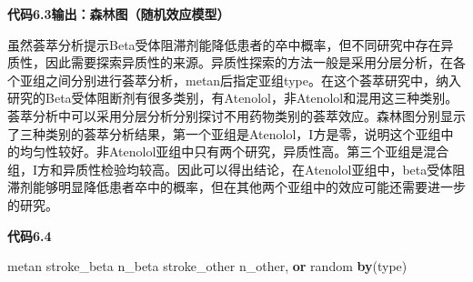 \documentclass[
  chinese-hans,
  letterpaper,
  DIV=11,
  numbers=noendperiod]{scrreprt}
\newenvironment{Shaded}{\begin{snugshade}}{\end{snugshade}}
\newcommand{\DecValTok}[1]{\textcolor[rgb]{0.68,0.00,0.00}{#1}}
\newcommand{\KeywordTok}[1]{\textcolor[rgb]{0.00,0.23,0.31}{\textbf{#1}}}
\newcommand{\NormalTok}[1]{\textcolor[rgb]{0.00,0.23,0.31}{#1}}
\begin{document}
\textbf{代码6.3输出：森林图（随机效应模型）}

虽然荟萃分析提示Beta受体阻滞剂能降低患者的卒中概率，但不同研究中存在异质性，因此需要探索异质性的来源。异质性探索的方法一般是采用分层分析，在各个亚组之间分别进行荟萃分析，metan后指定亚组type。在这个荟萃研究中，纳入研究的Beta受体阻断剂有很多类别，有Atenolol，非Atenolol和混用这三种类别。荟萃分析中可以采用分层分析分别探讨不用药物类别的荟萃效应。森林图分别显示了三种类别的荟萃分析结果，第一个亚组是Atenolol，I方是零，说明这个亚组中的均匀性较好。非Atenolol亚组中只有两个研究，异质性高。第三个亚组是混合组，I方和异质性检验均较高。因此可以得出结论，在Atenolol亚组中，beta受体阻滞剂能够明显降低患者卒中的概率，但在其他两个亚组中的效应可能还需要进一步的研究。

\begin{tcolorbox}[enhanced jigsaw, arc=.35mm, bottomrule=.15mm, breakable, colback=white, colframe=quarto-callout-note-color-frame, left=2mm, leftrule=.75mm, opacityback=0, rightrule=.15mm, toprule=.15mm]

\vspace{-3mm}\textbf{代码6.4}\vspace{3mm}

\begin{Shaded}
\begin{Highlighting}[]
\NormalTok{metan stroke\_beta n\_beta stroke\_other n\_other, }\KeywordTok{or}\NormalTok{ random }\KeywordTok{by}\NormalTok{(}\DecValTok{type}\NormalTok{)}
\end{Highlighting}
\end{Shaded}

\end{tcolorbox}
\end{document}
